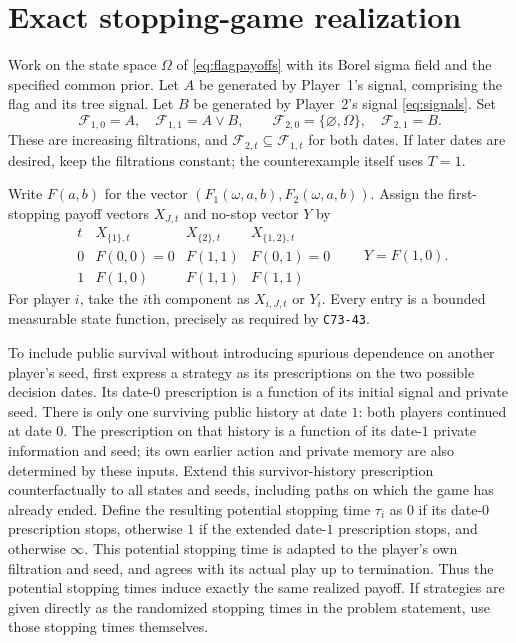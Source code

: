 \documentclass[11pt]{article}
\theoremstyle{remark}
\newcommand{\F}{\mathcal F}
\begin{document}
\section{Exact stopping-game realization}

Work on the state space $\Omega$ of \eqref{eq:flagpayoffs} with its
Borel sigma field and the specified common prior. Let $A$ be generated
by Player~1's signal, comprising the flag and its tree signal. Let $B$
be generated by Player~2's signal \eqref{eq:signals}. Set
\begin{equation}\label{eq:filtrations}
 \F_{1,0}=A,\quad \F_{1,1}=A\vee B,\qquad
 \F_{2,0}=\{\varnothing,\Omega\},\quad \F_{2,1}=B.
\end{equation}
These are increasing filtrations, and
$\F_{2,t}\subseteq\F_{1,t}$ for both dates. If later dates are
desired, keep the filtrations constant; the counterexample itself uses
$T=1$.

Write $F(a,b)$ for the vector
$(F_1(\omega,a,b),F_2(\omega,a,b))$. Assign the first-stopping
payoff vectors $X_{J,t}$ and no-stop vector $Y$ by
\begin{equation}\label{eq:stoppingpayoffs}
\begin{array}{c|ccc}
 t&X_{\{1\},t}&X_{\{2\},t}&X_{\{1,2\},t}\\ \hline
 0&F(0,0)=0&F(1,1)&F(0,1)=0\\
 1&F(1,0)&F(1,1)&F(1,1)
\end{array}
\qquad Y=F(1,0).
\end{equation}
For player $i$, take the $i$th component as $X_{i,J,t}$ or $Y_i$.
Every entry is a bounded measurable state function, precisely as
required by \texttt{C73-43}.

To include public survival without introducing spurious dependence on
another player's seed, first express a strategy as its prescriptions on
the two possible decision dates. Its date-$0$ prescription is a function
of its initial signal and private seed. There is only one surviving public
history at date $1$: both players continued at date $0$. The prescription
on that history is a function of its date-$1$ private information and seed;
its own earlier action and private memory are also determined by these
inputs. Extend this survivor-history prescription counterfactually to all
states and seeds, including paths on which the game has already ended.
Define the resulting potential stopping time $\tau_i$ as $0$ if its
date-$0$ prescription stops, otherwise $1$ if the extended date-$1$
prescription stops, and otherwise $\infty$. This potential stopping time
is adapted to the player's own filtration and seed, and agrees with its
actual play up to termination. Thus the potential stopping times induce
exactly the same realized payoff. If strategies are given directly as the
randomized stopping times in the problem statement, use those stopping
times themselves.
\end{document}
